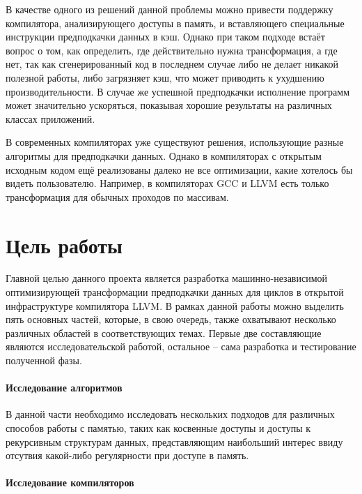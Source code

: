 \documentclass[12pt,a4paper,oneside]{article}
\begin{document}
В качестве одного из решений данной проблемы можно привести поддержку компилятора, анализирующего доступы в память, и вставляющего специальные инструкции предподкачки данных в кэш. Однако при таком подходе встаёт вопрос о том, как определить, где действительно нужна трансформация, а где нет, так как сгенерированный код в последнем случае либо не делает никакой полезной работы, либо загрязняет кэш, что может приводить к ухудшению производительности. В случае же успешной предподкачки исполнение программ может значительно ускоряться, показывая хорошие результаты на различных классах приложений\cite{MemAcc}.

В современных компиляторах уже существуют решения, использующие разные алгоритмы для предподкачки данных. Однако в компиляторах с открытым исходным кодом ещё реализованы далеко не все оптимизации, какие хотелось бы видеть пользователю. Например, в компиляторах GCC\cite{GCCPref} и LLVM есть только трансформация для обычных проходов по массивам.

\newpage

\section{Цель работы}

\indent

Главной целью данного проекта является разработка машинно-независимой оптимизирующей трансформации предподкачки данных для циклов в открытой инфраструктуре компилятора LLVM. В рамках данной работы можно выделить пять основных частей, которые, в свою очередь, также охватывают несколько различных областей в соответствующих темах. Первые две составляющие являются исследовательской работой, остальное -- сама разработка и тестирование полученной фазы.

\paragraph{Исследование алгоритмов}

В данной части необходимо исследовать нескольких подходов для различных способов работы с памятью, таких как косвенные доступы и доступы к рекурсивным структурам данных, представляющим наибольший интерес ввиду отсутвия какой-либо регулярности при доступе в память.

\paragraph{Исследование компиляторов}
\end{document}
